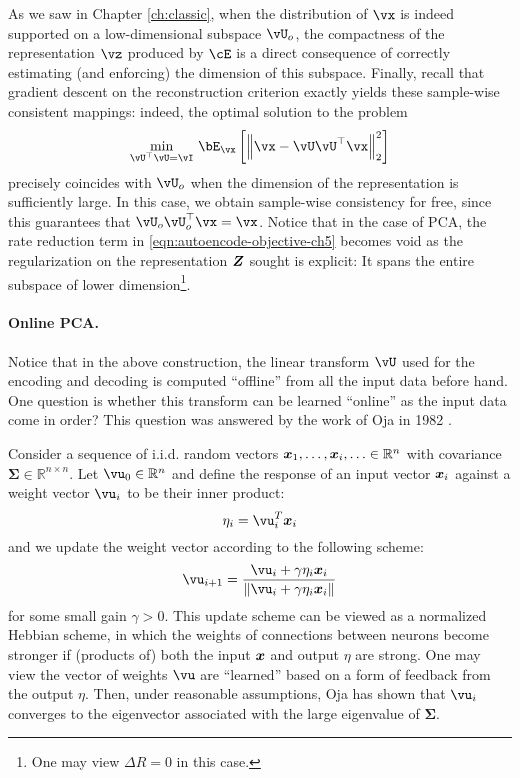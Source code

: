 \documentclass[\toplevelprefix/book-main.tex]{subfiles}
\begin{document}
As we saw in Chapter \ref{ch:classic}, when the distribution of $\vx$ is indeed
supported on a low-dimensional subspace $\vU_o$, the compactness of
the representation
$\vz$ produced by $\cE$ is a direct consequence of correctly
estimating (and enforcing) the dimension of this subspace.  Finally,
recall that gradient descent on the reconstruction criterion exactly
yields these sample-wise consistent mappings: indeed, the optimal
solution to the problem
\begin{equation}\label{eq:pca-reconstruction-ch5}
  \min_{\vU^\top \vU = \vI}\, \bE_{\vx}\left[\norm*{\vx
  - \vU\vU^\top \vx}_2^2\right]
\end{equation}
precisely coincides with $\vU_o$ when the dimension of the representation is
sufficiently large. In this case, we obtain sample-wise consistency
for free, since this guarantees that $\vU_o\vU_o^\top \vx = \vx$.
Notice that in the case of PCA, the rate reduction term in
\eqref{eqn:autoencode-objective-ch5} becomes void as the regularization
on the representation $\bm{Z}$ sought is explicit: It spans the entire
subspace of lower dimension\footnote{One may view $\Delta R = 0$ in this case.}.

\paragraph{Online PCA.} Notice that in the above construction, the
linear transform $\vU$
used for the encoding and decoding is computed ``offline'' from all
the input data before hand. One question is whether this transform
can be learned ``online'' as the input data come in order? This
question was answered by the work of Oja in 1982 \cite{Oja1982SimplifiedNM}.
\begin{example} Consider a
  sequence of i.i.d. random vectors $\bm{x}_1, \ldots, \bm{x}_i, \ldots \in
  \mathbb{R}^n$ with covariance $\boldsymbol{\Sigma} \in
  \mathbb{R}^{n\times n}$. Let $\vu_0 \in \mathbb{R}^n$ and define
  the response of an input vector $\bm{x}_i$ against a weight vector
  $\vu_i$ to be their inner product:
  \begin{equation}
    \eta_i = \vu_i^T \x_i
  \end{equation}
  and we update the weight vector according to the following scheme:
  \begin{equation}
    \vu_{i+1} = \frac{\vu_i + \gamma \eta_i \x_i}{\|\vu_i + \gamma
    \eta_i \x_i\|}
    \label{eqn:Hebbian}
  \end{equation}
  for some small gain $\gamma >0$. This update scheme can be viewed
  as a normalized Hebbian scheme, in which the weights of connections
  between neurons become stronger if (products of) both the input
  $\bm{x}$ and output $\eta$ are strong. One may view the vector of
  weights $\vu$ are ``learned'' based on a form of feedback from the
  output $\eta$.
  Then, under reasonable assumptions, Oja \cite{Oja1982SimplifiedNM} has 
  shown that $\vu_i$ converges to the eigenvector associated with
  the large eigenvalue of $\boldsymbol{\Sigma}$.
\end{example}
\end{document}
